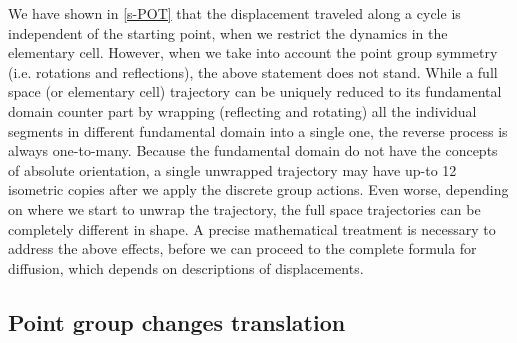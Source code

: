 We have shown in \ref{s-POT} that the displacement traveled along a
cycle is independent of the starting point, when we restrict the
dynamics in the elementary cell. However, when we take into account
the point group symmetry (i.e. rotations and reflections), the above
statement does  not stand. While a full space (or elementary cell)
trajectory can be uniquely reduced to its fundamental domain counter
part by wrapping (reflecting and rotating) all the individual segments
in different fundamental domain into a single one, the reverse process
is always one-to-many. Because the fundamental domain do not have the
concepts of absolute orientation, a single unwrapped trajectory may
have up-to 12 isometric copies after we apply the discrete group
actions. Even worse, depending on where we start to unwrap the
trajectory, the full space trajectories can be completely different in
shape. A precise mathematical treatment is necessary to address the
above effects, before we can proceed to the complete formula for
diffusion, which depends on descriptions of displacements.




\subsection{Point group changes translation \label{s-FundTranslation}}

